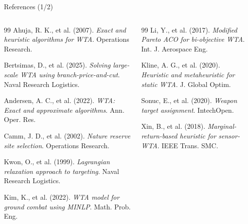 \documentclass[aspectratio=43,8pt]{beamer}
\begin{document}
\begin{frame}{References (1/2)}
\begin{columns}[t]
\scriptsize
\begin{thebibliography}{99}
Ahuja, R. K., et al. (2007). \textit{Exact and heuristic algorithms for WTA}. Operations Research.

Bertsimas, D., et al. (2025). \textit{Solving large-scale WTA using branch-price-and-cut}. Naval Research Logistics.

Andersen, A. C., et al. (2022). \textit{WTA: Exact and approximate algorithms}. Ann. Oper. Res.

Camm, J. D., et al. (2002). \textit{Nature reserve site selection}. Operations Research.

Kwon, O., et al. (1999). \textit{Lagrangian relaxation approach to targeting}. Naval Research Logistics.

Kim, K., et al. (2022). \textit{WTA model for ground combat using MINLP}. Math. Prob. Eng.
\end{thebibliography}

\scriptsize
\begin{thebibliography}{99}
\setcounter{enumiv}{6}
Li, Y., et al. (2017). \textit{Modified Pareto ACO for bi-objective WTA}. Int. J. Aerospace Eng.

Kline, A. G., et al. (2020). \textit{Heuristic and metaheuristic for static WTA}. J. Global Optim.

Sonuc, E., et al. (2020). \textit{Weapon target assignment}. IntechOpen.

Xin, B., et al. (2018). \textit{Marginal-return-based heuristic for sensor-WTA}. IEEE Trans. SMC.
\end{thebibliography}
\end{columns}
\end{frame}
\end{document}
